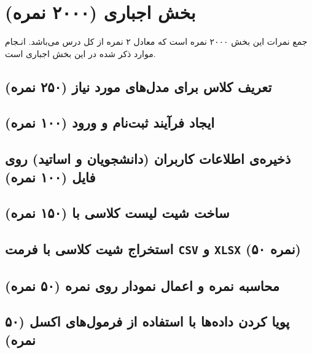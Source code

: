 \documentclass{report}[a4paper]
\begin{document}


\newpage
\tableofcontents

\newpage



\chapter{بخش اجباری (۲۰۰۰ نمره)}
\begin{center}
    \begin{warningbox}
        \Large
        جمع نمرات این بخش ۲۰۰۰ نمره است که معادل ۲ نمره از کل درس می‌باشد.
        انـجام موارد ذکر شده در این بخش اجباری است.
    \end{warningbox}
\end{center}

\section{تعریف کلاس برای مدل‌های مورد نیاز (۲۵۰ نمره)}

\section{ایجاد فرآیند ثبت‌نام و ورود (۱۰۰ نمره)}

\section{ذخیره‌ی اطلاعات کاربران (دانشجویان و اساتید) روی فایل (۱۰۰ نمره)}

\section{ساخت شیت لیست کلاسی با  (۱۵۰ نمره)}

\section{استخراج شیت کلاسی با فرمت \texttt{CSV} و \texttt{XLSX} (۵۰ نمره)}

\section{محاسبه نمره و اعمال نمودار روی نمره (۵۰ نمره)}

\section{پویا کردن داده‌ها با استفاده از فرمول‌های اکسل (۵۰ نمره)}
\end{document}
